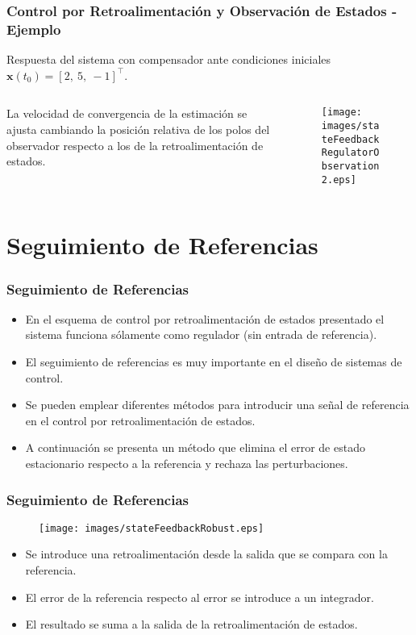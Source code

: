 \documentclass[aspectratio=169]{beamer}
\theoremstyle{definition}
\theoremstyle{plain}
\theoremstyle{remark}
\begin{document}
\begin{frame}[c]\frametitle{Control por Retroalimentación y Observación de Estados - Ejemplo}
	\small
	Respuesta del sistema con compensador ante condiciones iniciales $\mathbf{x}(t_0) = [2,\ 5,\ -1]^\intercal$.
	\vspace{-2mm}
	\begin{columns}
		\begin{column}{0.3\textwidth}
			La velocidad de convergencia de la estimación se ajusta cambiando la posición relativa de los polos del observador respecto a los de la retroalimentación de estados.
		\end{column}
		\begin{column}{0.7\textwidth}
			\begin{figure}
				\centering
				\texttt{[image: images/stateFeedbackRegulatorObservation2.eps]}
			\end{figure}
		\end{column}
	\end{columns}
\end{frame}

\section{Seguimiento de Referencias}
\begin{frame}[<+->]\frametitle{Seguimiento de Referencias}
	\begin{itemize}
		\item En el esquema de control por retroalimentación de estados presentado el sistema funciona sólamente como regulador (sin entrada de referencia).
		\item El seguimiento de referencias es muy importante en el diseño de sistemas de control.
		\item Se pueden emplear diferentes métodos para introducir una señal de referencia en el control por retroalimentación de estados.
		\item A continuación se presenta un método que elimina el error de estado estacionario respecto a la referencia y rechaza las perturbaciones.
	\end{itemize}
\end{frame}

\begin{frame}[c]\frametitle{Seguimiento de Referencias}
	\begin{figure}
		\centering
		\texttt{[image: images/stateFeedbackRobust.eps]}
	\end{figure}
	\begin{itemize}
		\item<2-> Se introduce una retroalimentación desde la salida que se compara con la referencia.
		\item<3-> El error de la referencia respecto al error se introduce a un integrador.
		\item<4-> El resultado se suma a la salida de la retroalimentación de estados.
	\end{itemize}
\end{frame}
\end{document}
